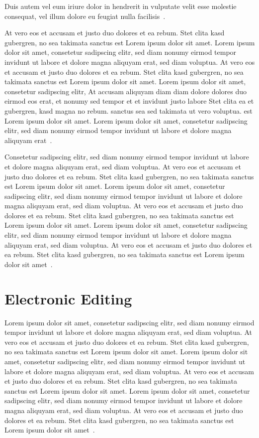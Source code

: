 Duis autem vel eum iriure dolor in hendrerit in vulputate velit esse molestie
consequat, vel illum dolore eu feugiat nulla facilisis~\cite{gay:tnlah}.

At vero eos et accusam et justo duo dolores et ea rebum. Stet clita kasd
gubergren, no sea takimata sanctus est Lorem ipsum dolor sit amet. Lorem ipsum
dolor sit amet, consetetur sadipscing elitr,  sed diam nonumy eirmod tempor
invidunt ut labore et dolore magna aliquyam erat, sed diam voluptua. At vero
eos et accusam et justo duo dolores et ea rebum. Stet clita kasd gubergren, no
sea takimata sanctus est Lorem ipsum dolor sit amet. Lorem ipsum dolor sit
amet, consetetur sadipscing elitr,  At accusam aliquyam diam diam dolore
dolores duo eirmod eos erat, et nonumy sed tempor et et invidunt justo labore
Stet clita ea et gubergren, kasd magna no rebum. sanctus sea sed takimata ut
vero voluptua. est Lorem ipsum dolor sit amet. Lorem ipsum dolor sit amet,
consetetur sadipscing elitr,  sed diam nonumy eirmod tempor invidunt ut labore
et dolore magna aliquyam erat~\cite{giro:asfse}.

Consetetur sadipscing elitr,  sed diam nonumy eirmod tempor invidunt ut labore
et dolore magna aliquyam erat, sed diam voluptua. At vero eos et accusam et
justo duo dolores et ea rebum. Stet clita kasd gubergren, no sea takimata
sanctus est Lorem ipsum dolor sit amet. Lorem ipsum dolor sit amet, consetetur
sadipscing elitr,  sed diam nonumy eirmod tempor invidunt ut labore et dolore
magna aliquyam erat, sed diam voluptua. At vero eos et accusam et justo duo
dolores et ea rebum. Stet clita kasd gubergren, no sea takimata sanctus est
Lorem ipsum dolor sit amet. Lorem ipsum dolor sit amet, consetetur sadipscing
elitr,  sed diam nonumy eirmod tempor invidunt ut labore et dolore magna
aliquyam erat, sed diam voluptua. At vero eos et accusam et justo duo dolores
et ea rebum. Stet clita kasd gubergren, no sea takimata sanctus est Lorem ipsum
dolor sit amet~\cite{giro:esase}.

\section{Electronic Editing}
Lorem ipsum dolor sit amet, consetetur sadipscing elitr,  sed diam nonumy eirmod
tempor invidunt ut labore et dolore magna aliquyam erat, sed diam voluptua. At
vero eos et accusam et justo duo dolores et ea rebum. Stet clita kasd gubergren,
no sea takimata sanctus est Lorem ipsum dolor sit amet. Lorem ipsum dolor sit
amet, consetetur sadipscing elitr,  sed diam nonumy eirmod tempor invidunt ut
labore et dolore magna aliquyam erat, sed diam voluptua. At vero eos et accusam
et justo duo dolores et ea rebum. Stet clita kasd gubergren, no sea takimata
sanctus est Lorem ipsum dolor sit amet. Lorem ipsum dolor sit amet, consetetur
sadipscing elitr,  sed diam nonumy eirmod tempor invidunt ut labore et dolore
magna aliquyam erat, sed diam voluptua. At vero eos et accusam et justo duo
dolores et ea rebum. Stet clita kasd gubergren, no sea takimata sanctus est
Lorem ipsum dolor sit amet~\cite{glas:srwao}.

